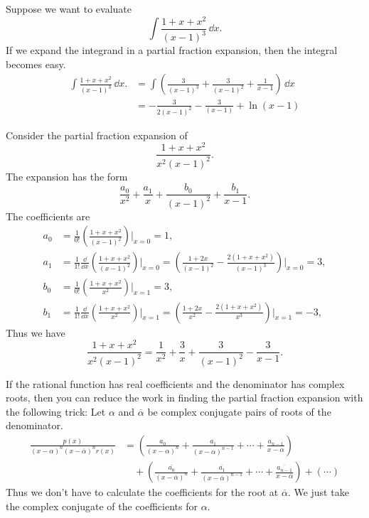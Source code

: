 \begin{Example}
  Suppose we want to evaluate 
  \[
  \int \frac{1+x+x^2}{(x-1)^3} \,\dd x.
  \]
  If we expand the integrand in a partial fraction expansion, then the integral
  becomes easy.
  \begin{align*}
    \int \frac{1+x+x^2}{(x-1)^3} \,\dd x.
    &= \int \left( \frac{3}{(x-1)^3} + \frac{3}{(x-1)^2}
      + \frac{1}{x-1} \right)\,\dd x \\
    &= - \frac{3}{2 (x-1)^2} - \frac{3}{(x-1)} + \ln(x-1)
  \end{align*}
\end{Example}







\begin{Example}
  Consider the partial fraction expansion of
  \[
  \frac{1+x+x^2}{x^2 (x-1)^2}.
  \]
  The expansion has the form
  \[
  \frac{a_0}{x^2} + \frac{a_1}{x} + \frac{b_0}{(x-1)^2} + \frac{b_1}{x-1}.
  \]
  The coefficients are
  \begin{align*}
    a_0     &= \frac{1}{0!} \left( \frac{1+x+x^2}{(x-1)^2} \right)
    \bigg|_{x=0} = 1, \\
    a_1     &= \frac{1}{1!} \frac{\dd}{\dd x}
    \left( \frac{1+x+x^2}{(x-1)^2} \right) \bigg|_{x=0}
    = \left( \frac{1+2x}{(x-1)^2}
      - \frac{2(1+x+x^2)}{(x-1)^3} \right) \bigg|_{x=0}
    = 3, \\
    b_0     &= \frac{1}{0!} \left( \frac{1+x+x^2}{x^2} \right)
    \bigg|_{x=1} = 3, \\
    b_1     &= \frac{1}{1!} \frac{\dd}{\dd x}
    \left( \frac{1+x+x^2}{x^2} \right) \bigg|_{x=1}
    = \left( \frac{1+2x}{x^2}
      - \frac{2(1+x+x^2)}{x^3} \right) \bigg|_{x=1}
    = -3,
  \end{align*}
  Thus we have
  \[
  \frac{1+x+x^2}{x^2 (x-1)^2} = \frac{1}{x^2} + \frac{3}{x}
  + \frac{3}{(x-1)^2} - \frac{3}{x-1}.
  \]
\end{Example}




If the rational function has real coefficients and the denominator
has complex roots, then you can reduce the work in finding the partial
fraction expansion with the following trick:  Let $\alpha$ and $\overline{\alpha}$
be complex conjugate pairs of roots of the denominator.
\begin{align*}
  \frac{p(x)}{(x-\alpha)^n (x- \overline{\alpha})^n r(x)}
  &= \left( \frac{a_0}{(x-\alpha)^n}
    + \frac{a_1}{(x-\alpha)^{n-1}} + \cdots + \frac{a_{n-1}}{x-\alpha}
  \right) \\
  &\quad + \left( \frac{\overline{a_0}}{(x-\overline{\alpha})^n}
    + \frac{\overline{a_1}}{(x-\overline{\alpha})^{n-1}} + \cdots
    + \frac{\overline{a_{n-1}}}{x-\overline{\alpha}} \right)
  + (\cdots)
\end{align*}
Thus we don't have to calculate the coefficients for the root at
$\overline{\alpha}$.  We just take the complex conjugate of the coefficients
for $\alpha$.






